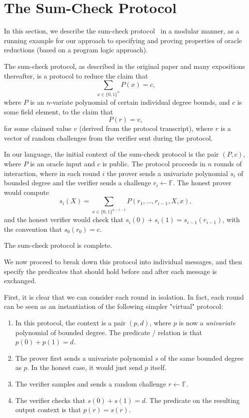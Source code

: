 \section{The Sum-Check Protocol}\label{sec:sumcheck}

In this section, we describe the sum-check protocol~\cite{sumcheck-protocol} in a modular manner, as a running example for our approach to specifying and proving properties of oracle reductions (based on a program logic approach).

The sum-check protocol, as described in the original paper and many expositions thereafter, is a
protocol to reduce the claim that \[ \sum_{x \in \{0, 1\}^n} P(x) = c, \] where $P$ is an
$n$-variate polynomial of certain individual degree bounds, and $c$ is some field element, to the
claim that \[ P(r) = v, \] for some claimed value $v$ (derived from the protocol transcript), where
$r$ is a vector of random challenges from the verifier sent during the protocol.

In our language, the initial context of the sum-check protocol is the pair $(P, c)$, where $P$ is an
oracle input and $c$ is public. The protocol proceeds in $n$ rounds of interaction, where in each
round $i$ the prover sends a univariate polynomial $s_i$ of bounded degree and the verifier sends a
challenge $r_i \gets \mathbb{F}$. The honest prover would compute \[ s_i(X) = \sum_{x \in \{0,
1\}^{n - i - 1}} P(r_1, \ldots, r_{i - 1}, X, x), \] and the honest verifier would check that
$s_i(0) + s_i(1) = s_{i - 1}(r_{i - 1})$, with the convention that $s_0(r_0) = c$.

\begin{theorem}
    The sum-check protocol is complete.
    \label{thm:sumcheck_protocol_complete}
\end{theorem}

We now proceed to break down this protocol into individual messages, and then specify the predicates that should hold before and after each message is exchanged.

First, it is clear that we can consider each round in isolation. In fact, each round can be seen as an instantiation of the following simpler "virtual" protocol:

\begin{definition}
    \label{def:virtual_sumcheck_round_protocol}
    \begin{enumerate}
        \item In this protocol, the context is a pair $(p, d)$, where $p$ is now a \emph{univariate} polynomial of bounded degree. The predicate / relation is that $p(0) + p(1) = d$.
        \item The prover first sends a univariate polynomial $s$ of the same bounded degree as $p$. In
        the honest case, it would just send $p$ itself.
        \item The verifier samples and sends a random challenge $r \gets \mathbb{F}$.
        \item The verifier checks that $s(0) + s(1) = d$. The predicate on the resulting output context
        is that $p(r) = s(r)$.
    \end{enumerate}
\end{definition}


